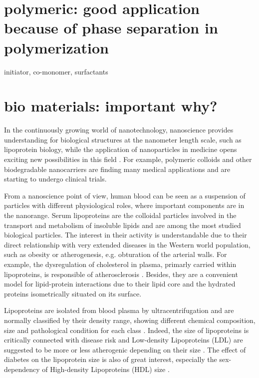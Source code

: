 \section{polymeric: good application because of phase separation in polymerization}

initiator, co-monomer, surfactants

\section{bio materials: important why?}

In the continuously growing world of nanotechnology, nanoscience provides understanding for biological structures at the nanometer length scale, such as lipoprotein biology, while the application of nanoparticles in medicine opens exciting new possibilities in this field \citep{nie_nanotechnology_2007, sahoo_nanotech_2003, wickline_nanotechnology_2003, zhou_nano-enabled_2014, rosen_rise_2005}. For example, polymeric colloids and other biodegradable nanocarriers are finding many medical applications\citep{vicent_polymer_2006} and are starting to undergo clinical trials\citep{patel_polymeric_2012,beija_colloidal_2012,cabral_progress_2014}. 

From a nanoscience point of view, human blood can be seen as a suspension of particles with different physiological roles, where important components are in the nanorange. Serum lipoproteins are the colloidal particles involved in the transport and metabolism of insoluble lipids and are among the most studied biological particles. The interest in their activity is understandable due to their direct relationship with very extended diseases in the Western world population, such as obesity or atherogenesis, e.g. obturation of the arterial walls. For example, the dysregulation of cholesterol in plasma, primarly carried within lipoproteins, is responsible of atherosclerosis \citep{munro_pathogenesis_1988}. Besides, they are a convenient model for lipid-protein interactions \citep{assmann_lipid-protein_1974} due to their lipid core and the hydrated proteins isometrically situated on its surface.

Lipoproteins are isolated from blood plasma by ultracentrifugation \citep{havel_distribution_1955} and are normally classified by their density range, showing different chemical composition, size and pathological condition for each class \citep{german_lipoproteins:_2006}. Indeed, the size of lipoproteins is critically connected with disease risk \citep{gardner_cd_association_1996} and Low-density Lipoproteins (LDL) are suggested to be more or less atherogenic depending on their size \citep{dreon_low-density_1994}. The effect of diabetes on the lipoprotein size is also of great interest, especially the sex-dependency of High-density Lipoproteins (HDL) size \citep{colhoun_lipoprotein_2002}.

